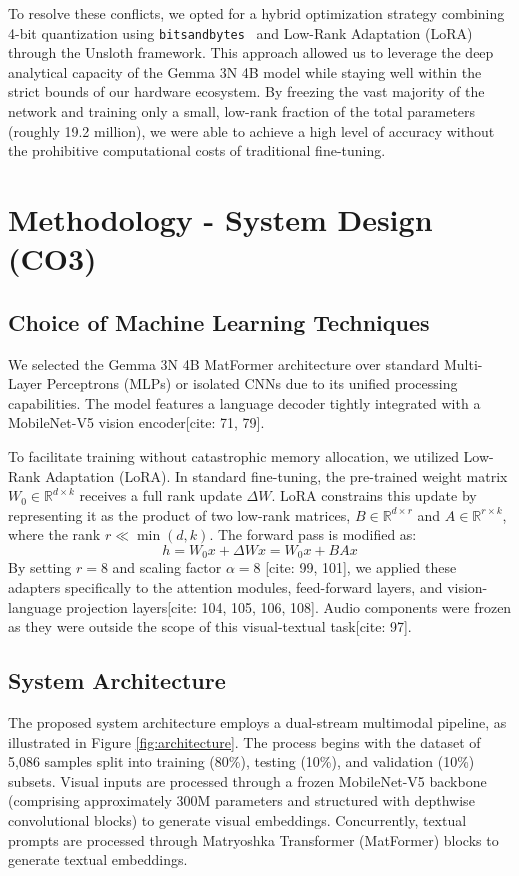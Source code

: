 \documentclass[11pt]{article}
\begin{document}
To resolve these conflicts, we opted for a hybrid optimization strategy combining 4-bit quantization using \texttt{bitsandbytes}~\cite{dettmers2023qlora} and Low-Rank Adaptation (LoRA)~\cite{hu2021lora} through the Unsloth framework. This approach allowed us to leverage the deep analytical capacity of the Gemma 3N 4B model while staying well within the strict bounds of our hardware ecosystem. By freezing the vast majority of the network and training only a small, low-rank fraction of the total parameters (roughly 19.2 million), we were able to achieve a high level of accuracy without the prohibitive computational costs of traditional fine-tuning.

\section{Methodology - System Design (CO3)}

\subsection{Choice of Machine Learning Techniques}
We selected the Gemma 3N 4B MatFormer architecture over standard Multi-Layer Perceptrons (MLPs) or isolated CNNs due to its unified processing capabilities. The model features a language decoder tightly integrated with a MobileNet-V5 vision encoder[cite: 71, 79].

To facilitate training without catastrophic memory allocation, we utilized Low-Rank Adaptation (LoRA). In standard fine-tuning, the pre-trained weight matrix $W_0 \in \mathbb{R}^{d \times k}$ receives a full rank update $\Delta W$. LoRA constrains this update by representing it as the product of two low-rank matrices, $B \in \mathbb{R}^{d \times r}$ and $A \in \mathbb{R}^{r \times k}$, where the rank $r \ll \min(d, k)$. The forward pass is modified as:
\begin{equation}
    h = W_0 x + \Delta W x = W_0 x + B A x
\end{equation}
By setting $r=8$ and scaling factor $\alpha=8$ [cite: 99, 101], we applied these adapters specifically to the attention modules, feed-forward layers, and vision-language projection layers[cite: 104, 105, 106, 108]. Audio components were frozen as they were outside the scope of this visual-textual task[cite: 97].

\subsection{System Architecture}
The proposed system architecture employs a dual-stream multimodal pipeline, as illustrated in Figure \ref{fig:architecture}. The process begins with the dataset of 5,086 samples split into training (80\%), testing (10\%), and validation (10\%) subsets. Visual inputs are processed through a frozen MobileNet-V5 backbone (comprising approximately 300M parameters and structured with depthwise convolutional blocks) to generate visual embeddings. Concurrently, textual prompts are processed through Matryoshka Transformer (MatFormer) blocks to generate textual embeddings.
\end{document}
